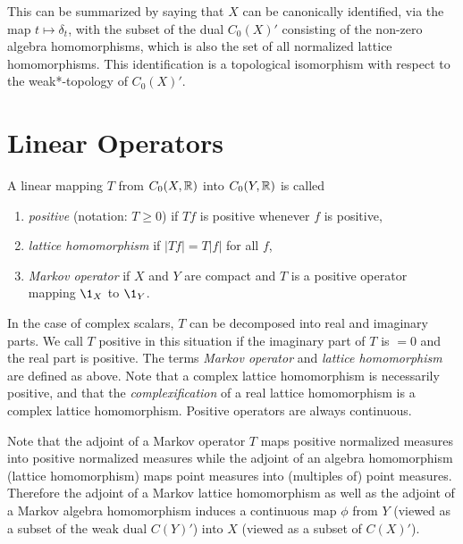 This can be summarized by saying that $X$ can be canonically identified, via the map $t \mapsto \delta_{t}$, with the subset of the dual $C_{0}(X)'$ consisting of the non-zero algebra homomorphisms, which is also the set of all normalized lattice homomorphisms.
This identification is a topological isomorphism with respect to the weak*-topology of\/ $ C_{0}(X)' $.
\section{Linear Operators}\label{sec:b1-3}%
A linear mapping $T$ from $C_{0}(X,\mathbb{R})$ into $C_{0}(Y,\mathbb{R})$ is called
\begin{enumerate}[\upshape (i), labelindent=.25em]

\item
\emph{positive} (notation: $T \geq 0$)  if\/ $Tf$  is positive whenever $ f $ is positive, 

\item
\emph{lattice homomorphism}  if\/ $|Tf| = T|f|$  for all $ f $,

\item
\emph{Markov operator}  if  $ X $ and $ Y $ are compact and $ T $ is a positive operator mapping $\1_{X}$ to $\1_{Y}$.

\end{enumerate}
In the case of complex scalars, $T$ can be decomposed into real and imaginary parts.
We call $T$ positive in this situation if the imaginary part of\/ $T$ is $= 0$ and the real part is positive.
The terms \emph{Markov operator} and \emph{lattice homomorphism} are defined as above.
Note that a complex lattice homomorphism is necessarily positive, and that the \emph{complexification} of a real lattice homomorphism is a complex lattice homomorphism.
Positive operators are always continuous.

Note that the adjoint of a Markov operator $T$ maps positive normalized measures into positive normalized measures while the adjoint of an algebra homomorphism (lattice homomorphism) maps point measures into (multiples of) point measures.
Therefore the adjoint of a Markov lattice homomorphism as well as the adjoint of a Markov algebra homomorphism induces a continuous map $\phi$ from $Y$ (viewed as a subset of the weak dual $C(Y)'$) into $X$ (viewed as a subset of\/ $C(X)'$).

